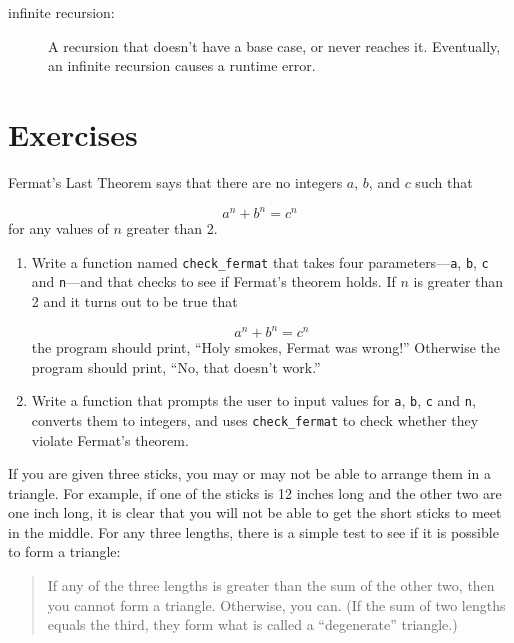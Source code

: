 \documentclass[10pt]{book}
\begin{document}
\begin{CJK}{UTF8}{gbsn}
\begin{description}
\item[infinite recursion:]  A recursion that doesn't have a
base case, or never reaches it.  Eventually, an infinite recursion
causes a runtime error.

\end{description}

\section{Exercises}

\begin{exercise}

Fermat's Last Theorem says that there are no integers
$a$, $b$, and $c$ such that

\[ a^n + b^n = c^n \]
%
for any values of $n$ greater than 2.

\begin{enumerate}

\item Write a function named \verb"check_fermat" that takes four
parameters---{\tt a}, {\tt b}, {\tt c} and {\tt n}---and
that checks to see if Fermat's theorem holds.  If
$n$ is greater than 2 and it turns out to be true that 

\[a^n + b^n = c^n \]
%
the program should print, ``Holy smokes, Fermat was wrong!''
Otherwise the program should print, ``No, that doesn't work.''

\item Write a function that prompts the user to input values
for {\tt a}, {\tt b}, {\tt c} and {\tt n}, converts them to
integers, and uses \verb"check_fermat" to check whether they
violate Fermat's theorem.

\end{enumerate}

\end{exercise}


\begin{exercise}

If you are given three sticks, you may or may not be able to arrange
them in a triangle.  For example, if one of the sticks is 12 inches
long and the other two are one inch long, it is clear that you will
not be able to get the short sticks to meet in the middle.  For any
three lengths, there is a simple test to see if it is possible to form
a triangle:

\begin{quotation}
If any of the three lengths is greater than the sum of the other
  two, then you cannot form a triangle.  Otherwise, you
  can.  (If the sum of two lengths equals the third, they form
    what is called a ``degenerate'' triangle.)
\end{quotation}


\end{exercise}
\end{CJK}
\end{document}
